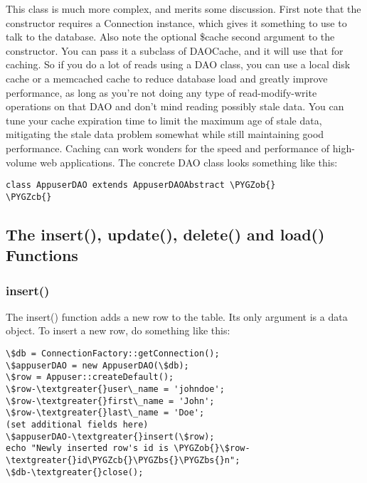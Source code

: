 \documentclass[letterpaper,10pt,english]{sphinxmanual}
\def\PYGZbs{\char`\\}
\def\PYGZob{\char`\{}
\def\PYGZcb{\char`\}}
\begin{document}
This class is much more complex, and merits some discussion.  First note that the constructor
requires a Connection instance, which gives it something to use to talk to the database.  Also note
the optional \$cache second argument to the constructor.  You can pass it a subclass of DAOCache, and
it will use that for caching.  So if you do a lot of reads using a DAO class, you can use a local
disk cache or a memcached cache to reduce database load and greatly improve performance, as long as
you're not doing any type of read-modify-write operations on that DAO and don't mind reading
possibly stale data.  You can tune your cache expiration time to limit the maximum age of stale
data, mitigating the stale data problem somewhat while still maintaining good performance.  Caching
can work wonders for the speed and performance of high-volume web applications.  The concrete DAO
class looks something like this:

\begin{Verbatim}[commandchars=\\\{\}]
class AppuserDAO extends AppuserDAOAbstract \PYGZob{}
\PYGZcb{}
\end{Verbatim}


\subsection{The insert(), update(), delete() and load() Functions}
\label{jaxFrameworkGuide:the-insert-update-delete-and-load-functions}

\subsubsection{insert()}
\label{jaxFrameworkGuide:insert}
The insert() function adds a new row to the table.  Its only argument is a data object.  To insert a
new row, do something like this:

\begin{Verbatim}[commandchars=\\\{\}]
\$db = ConnectionFactory::getConnection();
\$appuserDAO = new AppuserDAO(\$db);
\$row = Appuser::createDefault();
\$row-\textgreater{}user\_name = 'johndoe';
\$row-\textgreater{}first\_name = 'John';
\$row-\textgreater{}last\_name = 'Doe';
(set additional fields here)
\$appuserDAO-\textgreater{}insert(\$row);
echo "Newly inserted row's id is \PYGZob{}\$row-\textgreater{}id\PYGZcb{}\PYGZbs{}\PYGZbs{}n";
\$db-\textgreater{}close();
\end{Verbatim}
\end{document}
